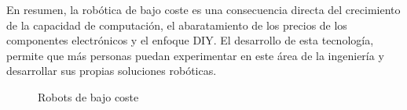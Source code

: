 En resumen, la robótica de bajo coste es una consecuencia directa del crecimiento de la capacidad de computación, 
el abaratamiento de los precios de los componentes electrónicos y el enfoque \acs{DIY}.
El desarrollo de esta tecnología, permite que más personas puedan experimentar en este área de la ingeniería y desarrollar 
sus propias soluciones robóticas.
\begin{figure} [ht!]
  \centering    
  \hspace{1cm}
  \caption{Robots de bajo coste}
\end{figure}
